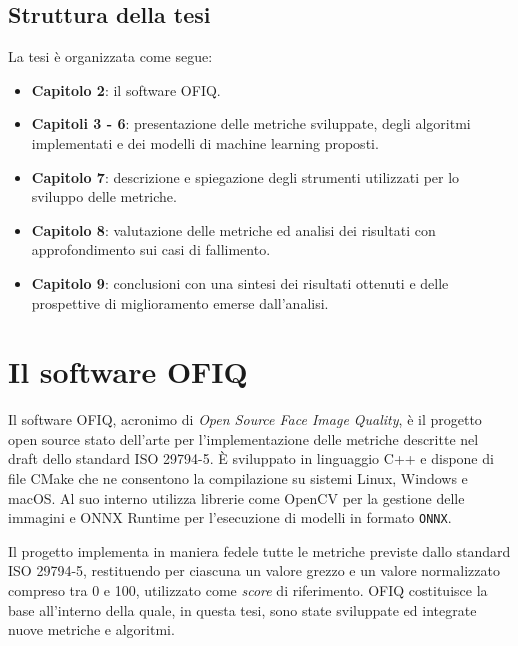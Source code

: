 \documentclass[12pt,a4paper,openright,twoside]{book}
\begin{document}
\section{Struttura della tesi}
La tesi è organizzata come segue: 
\begin{itemize}
    \item \textbf{Capitolo 2}: il software OFIQ.
    \item \textbf{Capitoli 3 - 6}: presentazione delle metriche sviluppate, degli algoritmi implementati e dei modelli di machine learning proposti.
    \item \textbf{Capitolo 7}: descrizione e spiegazione degli strumenti utilizzati per lo sviluppo delle metriche.
    \item \textbf{Capitolo 8}: valutazione delle metriche ed analisi dei risultati con approfondimento sui casi di fallimento.
    \item \textbf{Capitolo 9}: conclusioni con una sintesi dei risultati ottenuti e delle prospettive di miglioramento emerse dall'analisi.
\end{itemize}

\chapter{Il software OFIQ}
Il software OFIQ, acronimo di \textit{Open Source Face Image Quality}, è il progetto open source stato dell'arte per l'implementazione delle metriche descritte nel draft dello standard ISO 29794-5.  
È sviluppato in linguaggio C++ e dispone di file CMake che ne consentono la compilazione su sistemi Linux, Windows e macOS. Al suo interno utilizza librerie come OpenCV per la gestione delle immagini e ONNX Runtime per l'esecuzione di modelli in formato \texttt{ONNX}.  

Il progetto implementa in maniera fedele tutte le metriche previste dallo standard ISO 29794-5, restituendo per ciascuna un valore grezzo e un valore normalizzato compreso tra 0 e 100, utilizzato come \textit{score} di riferimento.  
OFIQ costituisce la base all'interno della quale, in questa tesi, sono state sviluppate ed integrate nuove metriche e algoritmi.  
\end{document}
